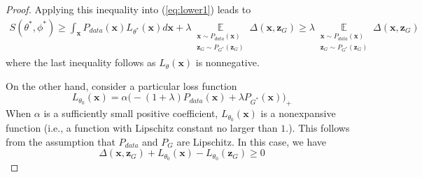 \begin{proof}
Applying this inequality into (\ref{eq:lower1}) leads to
\begin{equation}\label{eq:lower2}
\begin{aligned}
S(\theta^*,\phi^*)
\geq\int_\mathbf x P_{data}(\mathbf x)L_{\theta^*}(\mathbf x) d\mathbf x
+\lambda \mathop \mathbb E\limits_{\substack{\mathbf x\sim P_{data}(\mathbf x) \\ \mathbf z_G\sim P_{G^*}(\mathbf z_G)}}\Delta(\mathbf x, \mathbf z_G)
\geq\lambda \mathop \mathbb E\limits_{\substack{\mathbf x\sim P_{data}(\mathbf x) \\ \mathbf z_G\sim P_{G^*}(\mathbf z_G)}}\Delta(\mathbf x, \mathbf z_G)
\end{aligned}
\end{equation}
where the last inequality follows as $L_\theta(\mathbf x)$ is nonnegative.



On the other hand, consider a particular loss function
\begin{equation}\label{eq:L}
L_{\theta_0}(\mathbf x)=\alpha\big(-(1+\lambda) P_{data}(\mathbf x)+\lambda P_{G^*}(\mathbf x)\big)_+
\end{equation}
When $\alpha$ is a sufficiently small positive coefficient, $L_{\theta_0}(\mathbf x)$ is a nonexpansive function (i.e., a function with Lipschitz constant no larger than $1$.). This follows from the assumption that  $P_{data}$ and $P_G$ are Lipschitz.  In this case, we have
\begin{equation}\label{eq:nonex}
\Delta(\mathbf x, \mathbf z_G)
+L_{\theta_0}(\mathbf x)-L_{\theta_0}(\mathbf z_G) \geq 0
\end{equation}


\end{proof}
